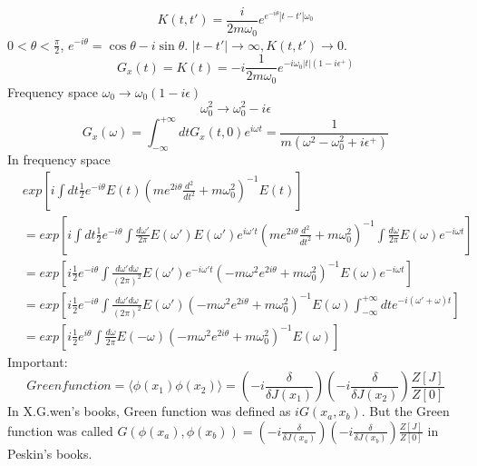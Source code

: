 \documentclass[a4paper,11pt]{article}
\begin{document}
\begin{equation*}
  K(t,t')=\frac{i}{2m\omega_0}e^{e^{-i\theta}|t-t'|\omega_0}
\end{equation*}
$0<\theta<\frac{\pi}{2}$, $e^{-i\theta}=\cos{\theta}-i\sin{\theta}$. $|t-t'|\to\infty,K(t,t')\to 0$.
\begin{equation*}
  G_x(t)=K(t)=-i\frac{1}{2m\omega_0}e^{-i\omega_0|t|(1-i\epsilon^+)}
\end{equation*}
Frequency space $\omega_0\longrightarrow\omega_0(1-i\epsilon)$
\begin{equation*}
  \omega_0^2\longrightarrow\omega_0^2-i\epsilon
\end{equation*}
\begin{equation*}
  G_x(\omega)=\int_{-\infty}^{+\infty}dtG_x(t,0)e^{i\omega t}=\frac{1}{m(\omega^2-\omega_0^2+i\epsilon^+)}
\end{equation*}
In frequency space
\begin{equation*}
  \begin{split}
     &exp\left[i\int dt\frac{1}{2}e^{-i\theta}E(t)\left(me^{2i\theta}\frac{d^2}{dt^2}+m\omega_0^2\right)^{-1}E(t)\right]\\
     &=exp\left[i\int dt\frac{1}{2}e^{-i\theta}\int\frac{d\omega'}{2\pi}E(\omega')E(\omega')e^{i\omega't}\left(me^{2i\theta}\frac{d^2}{dt^2}+m\omega_0^2\right)^{-1}\int\frac{d\omega}{2\pi}E(\omega)e^{-i\omega t}\right]\\
       &=exp\left[i\frac{1}{2}e^{-i\theta}\int\frac{d\omega'd\omega}{(2\pi)^2}E(\omega')e^{-i\omega't}\left(-m\omega^2e^{2i\theta}+m\omega_0^2\right)^{-1}E(\omega)e^{-i\omega t}\right]\\
       &=exp\left[i\frac{1}{2}e^{-i\theta}\int\frac{d\omega'd\omega}{(2\pi)^2}E(\omega')\left(-m\omega^2e^{2i\theta}+m\omega_0^2\right)^{-1}E(\omega)\int_{-\infty}^{+\infty}dte^{-i(\omega'+\omega)t}\right]\\
       &=exp\left[i\frac{1}{2}e^{i\theta}\int\frac{d\omega}{2\pi}E(-\omega)\left(-m\omega^2e^{2i\theta}+m\omega_0^2\right)^{-1}E(\omega)\right]
  \end{split}
\end{equation*}
Important:
\begin{equation*}
  Green function=\langle\phi(x_1)\phi(x_2)\rangle=\left(-i\frac{\delta}{\delta J(x_1)}\right)\left(-i\frac{\delta}{\delta J(x_2)}\right)\frac{Z[J]}{Z[0]}
\end{equation*}
In X.G.wen's books, Green function was defined as $iG(x_a,x_b)$. But the Green function was called $G(\phi(x_a),\phi(x_b))=\left(-i\frac{\delta}{\delta J(x_a)}\right)\left(-i\frac{\delta}{\delta J(x_b)}\right)\frac{Z[J]}{Z[0]}$ in Peskin's books.
\end{document}
